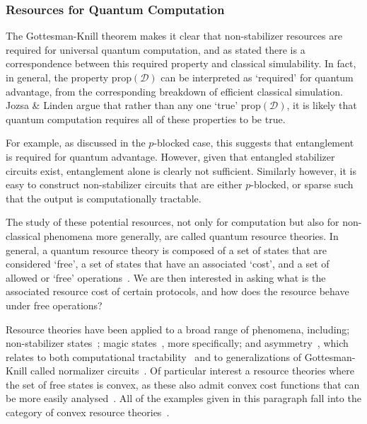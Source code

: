 \subsubsection*{Resources for Quantum Computation}
The Gottesman-Knill theorem makes it clear that non-stabilizer resources are required for universal quantum computation, and as stated there is a correspondence between this required property and classical simulability. In fact, in general, the property $\text{prop}\left(\mathcal{D}\right)$ can be interpreted as `required' for quantum advantage, from the corresponding breakdown of efficient classical simulation. Jozsa \& Linden argue that rather than any one `true' $\text{prop}\left(\mathcal{D}\right)$, it is likely that quantum computation requires all of these properties to be true.\par
For example, as discussed in the $p$-blocked case, this suggests that entanglement is required for quantum advantage. However, given that entangled stabilizer circuits exist, entanglement alone is clearly not sufficient. Similarly however, it is easy to construct non-stabilizer circuits that are either $p$-blocked, or sparse such that the output is computationally tractable.\par
The study of these potential resources, not only for computation but also for non-classical phenomena more generally, are called quantum resource theories. In general, a quantum resource theory is composed of a set of states that are considered `free', a set of states that have an associated `cost', and a set of allowed or `free' operations~\cite{Brandao2015}. We are then interested in asking what is the associated resource cost of certain protocols, and how does the resource behave under free operations?\par
Resource theories have been applied to a broad range of phenomena, including; non-stabilizer states~\cite{Veitch2014}; magic states~\cite{Howard2017}, more specifically; and asymmetry~\cite{Piani2016}, which relates to both computational tractability~\cite{VandenNest2009} and to generalizations of Gottesman-Knill called normalizer circuits~\cite{BermejoVega2014}. Of particular interest a resource theories where the set of free states is convex, as these also admit convex cost functions that can be more easily analysed~\cite{Regula2018}. All of the examples given in this paragraph fall into the category of convex resource theories~\cite{Chitambar2019}.\par
